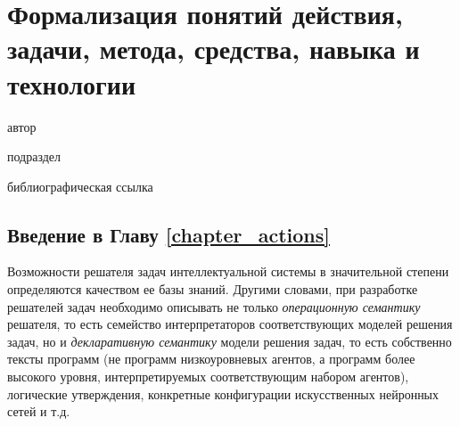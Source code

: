 \chapter{Формализация понятий действия, задачи, метода, средства, навыка и технологии}
\label{chapter_actions}

\vspace{-7\baselineskip}

\begin{SCn}
	\begin{scnrelfromlist}{автор}
	\end{scnrelfromlist}

	\bigskip


	\bigskip

	\begin{scnrelfromlist}{подраздел}
	\end{scnrelfromlist}

	\bigskip

	\begin{scnrelfromlist}{библиографическая ссылка}
	\end{scnrelfromlist}

\end{SCn}

\section*{Введение в Главу \ref{chapter_actions}}
Возможности решателя задач интеллектуальной системы в значительной степени определяются качеством ее базы знаний. Другими словами, при разработке решателей задач необходимо описывать не только \textit{операционную семантику} решателя, то есть семейство интерпретаторов соответствующих моделей решения задач, но и \textit{декларативную семантику} модели решения задач, то есть собственно тексты программ (не программ низкоуровневых агентов, а программ более высокого уровня, интерпретируемых соответствующим набором агентов), логические утверждения, конкретные конфигурации искусственных нейронных сетей и т.д.

